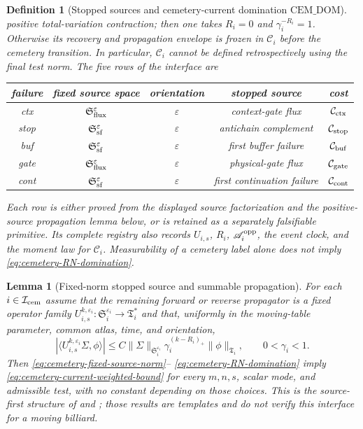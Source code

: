 \documentclass[11pt]{article}
\newtheorem{lemma}[theorem]{Lemma}
\newtheorem{definition}[theorem]{Definition}
\begin{document}
\begin{definition}[Stopped sources and cemetery-current domination
$\mathrm{CEM\_DOM}$]
positive total-variation contraction; then one takes $R_i=0$ and
$\gamma_i^{-R_i}=1$.  Otherwise its recovery and propagation envelope is
frozen in $\mathcal C_i$ before the cemetery transition.  In particular,
$\mathcal C_i$ cannot be defined retrospectively using the final test norm.
The five rows of the interface are
\begin{center}
\small
\begin{tabular}{c|c|c|c|c}
failure & fixed source space & orientation & stopped source & cost\\ \hline
ctx & $\mathfrak S_{\rm flux}^{\varepsilon}$ & $\varepsilon$ & context-gate flux & $\mathcal C_{\rm ctx}$\\
stop & $\mathfrak S_{\rm sf}^{\varepsilon}$ & $\varepsilon$ & antichain complement & $\mathcal C_{\rm stop}$\\
buf & $\mathfrak S_{\rm sf}^{\varepsilon}$ & $\varepsilon$ & first buffer failure & $\mathcal C_{\rm buf}$\\
gate & $\mathfrak S_{\rm flux}^{\varepsilon}$ & $\varepsilon$ & physical-gate flux & $\mathcal C_{\rm gate}$\\
cont & $\mathfrak S_{\rm sf}^{\varepsilon}$ & $\varepsilon$ & first continuation failure & $\mathcal C_{\rm cont}$
\end{tabular}
\end{center}
Each row is either proved from the displayed source factorization and the
positive-source propagation lemma below, or is retained as a separately
falsifiable primitive.  Its complete registry also records $U_{i,s}$,
$R_i$, $\mathscr A_i^{\rm opp}$, the event clock, and the moment law for
$\mathcal C_i$.  Measurability of a cemetery label alone does not imply
\eqref{eq:cemetery-RN-domination}.
\end{definition}

\begin{lemma}[Fixed-norm stopped source and summable propagation]
\label{lem:stopped-source-propagation}
For each $i\in\mathcal I_{\rm cem}$ assume that the remaining forward or
reverse propagator is a fixed operator family
$U_{i,s}^{k,\varepsilon_i}:\mathfrak S_i^{\varepsilon_i}\to
\mathfrak T_i^*$ and that, uniformly in the moving-table parameter, common
atlas, time, and orientation,
\begin{equation}
\label{eq:stopped-source-propagation}
 |\langle U_{i,s}^{k,\varepsilon_i}\Sigma,\phi\rangle|
 \le C\|\Sigma\|_{\mathfrak S_i^{\varepsilon_i}}
       \gamma_i^{(k-R_i)_+}\|\phi\|_{\mathfrak T_i},
 \qquad 0<\gamma_i<1.
\end{equation}
Then \eqref{eq:cemetery-fixed-source-norm}--
\eqref{eq:cemetery-RN-domination} imply
\eqref{eq:cemetery-current-weighted-bound} for every $m,n,s$, scalar mode,
and admissible test, with no constant depending on those choices.  This is
the source-first structure of
\cite[Proposition~2.5 and Hypothesis~H4]{CanestrariPerturb} and
\cite[Lemma~5.10]{CanestrariHoles}; those results are templates and do not
verify this interface for a moving billiard.
\end{lemma}
\end{document}
